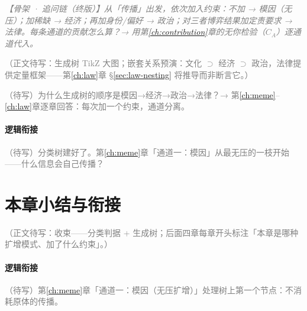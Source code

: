 \documentclass[../../main2.tex]{subfiles}
\begin{document}
	\textcolor{gray}{\textit{【骨架 · 追问链（终版）】从「传播」出发，依次加入约束：不加 → 模因（无压）；加稀缺 → 经济；再加身份/偏好 → 政治；对三者博弈结果加定责要求 → 法律。每条通道的贡献怎么算？→ 用第\ref{ch:contribution}章的无你检验（$C_A$）逐通道代入。}}

	\textcolor{gray}{（正文待写：生成树 TikZ 大图；嵌套关系预演：文化 $\supset$ 经济 $\supset$ 政治，法律提供定量框架——第\ref{ch:law}章 §\ref{sec:law-nesting} 将推导而非断言它。）}

	\begin{reader_anticipation}
		\item \textcolor{gray}{（待写）为什么生成树的顺序是模因→经济→政治→法律？→ 第\ref{ch:meme}--\ref{ch:law}章逐章回答：每次加一个约束，通道分离。}
	\end{reader_anticipation}

	\paragraph*{逻辑衔接}
	\textcolor{gray}{（待写）分类树建好了。第\ref{ch:meme}章「通道一：模因」从最无压的一枝开始——什么信息会自己传播？}

	\section{本章小结与衔接}
	\label{sec:gen-summary}

	\textcolor{gray}{（正文待写：收束——分类判据 + 生成树；后面四章每章开头标注「本章是哪种扩增模式、加了什么约束」。）}

	\paragraph*{逻辑衔接}
	\textcolor{gray}{（待写）第\ref{ch:meme}章「通道一：模因（无压扩增）」处理树上第一个节点：不消耗原体的传播。}
\end{document}
